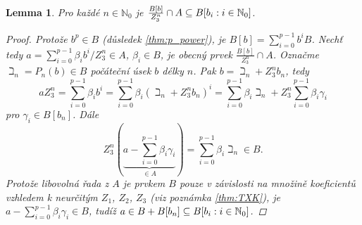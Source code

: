 \documentclass[11pt,a4paper]{article}
\newcommand\m[1]{\mathbb { #1 }} %
\newcommand\N{\m N}
\newcommand*{\mld}[1]{\[#1\]} %
\newcounter{numb}
\theoremstyle{definition}
\theoremstyle{plain}
\newtheorem{lemma}[numb]{Lemma}
\begin{document}
\begin{lemma}
	Pro každé $n \in \N_0$ je $\frac{B[b]}{Z_3^n} \cap A \subseteq \Ball$.
	
	\begin{proof}
		\newcommand*{\I}{_{i = 0}^{p - 1}}
		
		Protože $b^p \in B$ (důsledek \ref{thm:p_power}), je $B[b] = \sum\I b^i B$. Nechť tedy $a = \sum\I \beta_i b^i / Z_3^n \in A$, $\beta_i \in B$, je obecný prvek $\frac{B[b]}{Z_3^n} \cap A$. Označme $\beth_n = P_n(b) \in B$ počáteční úsek $b$ délky $n$. Pak $b = \beth_n + Z_3^n b_n$, tedy
		\mld{
			a Z_3^n = \sum\I \beta_i b^i = \sum\I \beta_i (\beth_n + Z_3^n b_n)^i = \sum\I \beta_i \beth_n + Z_3^n \sum\I \beta_i \gamma_i
		}
		pro $\gamma_i \in B[b_n]$. Dále
		\mld{
			Z_3^n (\underbrace{a - \sum\I \beta_i \gamma_i}_{\in A}) = \sum\I \beta_i \beth_n \in B.
		}
		Protože libovolná řada z $A$ je prvkem $B$ pouze v závislosti na množině koeficientů vzhledem k neurčitým $Z_1$, $Z_2$, $Z_3$ (viz poznámka \ref{thm:TXK}), je $a - \sum\I \beta_i \gamma_i \in B$, tudíž $a \in B + B[b_n] \subseteq \Ball$.
	\end{proof}
\end{lemma}
\end{document}
